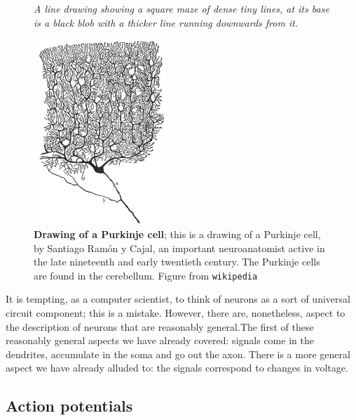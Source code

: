 \documentclass[12pt]{article}
\begin{document}
\begin{figure}[tbhp]
{\textsl{A line drawing showing a square maze of dense tiny lines, at its base is a black blob with a thicker line running downwards from it.}}
{
  \begin{center}
  \includegraphics[width=5cm]{PC.png}
  \end{center}
  }
  \caption{\textbf{Drawing of a Purkinje cell}; this is a drawing of a
    Purkinje cell, by Santiago Ram\'{o}n y Cajal, an important
    neuroanatomist active in the late nineteenth and early twentieth
    century. The Purkinje cells are found in the cerebellum. Figure from
    \texttt{wikipedia}\label{fig_PC}}
\end{figure}

It is tempting, as a computer scientist, to think of neurons as a sort
of universal circuit component; this is a mistake. However, there are,
nonetheless, aspect to the description of neurons that are reasonably
general.The first of these reasonably general aspects we have already
covered: signals come in the dendrites, accumulate in the soma and go
out the axon. There is a more general aspect we have already alluded
to: the signals correspond to changes in voltage.

\subsection*{Action potentials}
\end{document}
